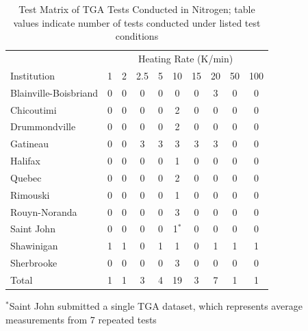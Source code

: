 \documentclass{book}
\begin{document}
\begin{table}[ht]
\caption{Test Matrix of TGA Tests Conducted in Nitrogen; table values indicate number of tests conducted under listed test conditions}
\label{Table:Matrix_TGA_N2}
\begin{center}
\begin{tabular}{lccccccccc}
\hline
                        & \multicolumn{9}{c}{Heating Rate (K/min)}                     \\ %
Institution             & 1     & 2   & 2.5 & 5   & 10    & 15  & 20  & 50  & 100      \\ \hline
Blainville-Boisbriand   &   0   & 0   & 0   & 0   & 0     & 0   & 3   & 0   & 0        \\
Chicoutimi              &   0   & 0   & 0   & 0   & 2     & 0   & 0   & 0   & 0        \\
Drummondville           &   0   & 0   & 0   & 0   & 2     & 0   & 0   & 0   & 0        \\
Gatineau                &   0   & 0   & 3   & 3   & 3     & 3   & 3   & 0   & 0        \\
Halifax                 &   0   & 0   & 0   & 0   & 1     & 0   & 0   & 0   & 0        \\
Quebec                  &   0   & 0   & 0   & 0   & 2     & 0   & 0   & 0   & 0        \\
Rimouski                &   0   & 0   & 0   & 0   & 1     & 0   & 0   & 0   & 0        \\
Rouyn-Noranda           &   0   & 0   & 0   & 0   & 3     & 0   & 0   & 0   & 0        \\
Saint John              &   0   & 0   & 0   & 0   & 1$^*$ & 0   & 0   & 0   & 0        \\
Shawinigan              &   1   & 1   & 0   & 1   & 1     & 0   & 1   & 1   & 1        \\
Sherbrooke              &   0   & 0   & 0   & 0   & 3     & 0   & 0   & 0   & 0        \\ \hline
Total                   &   1   & 1   & 3   & 4   & 19    & 3   & 7   & 1   & 1        \\ \hline
\end{tabular}
\end{center}
$^*$Saint John submitted a single TGA dataset, which represents average measurements from 7 repeated tests
\end{table}
\end{document}
